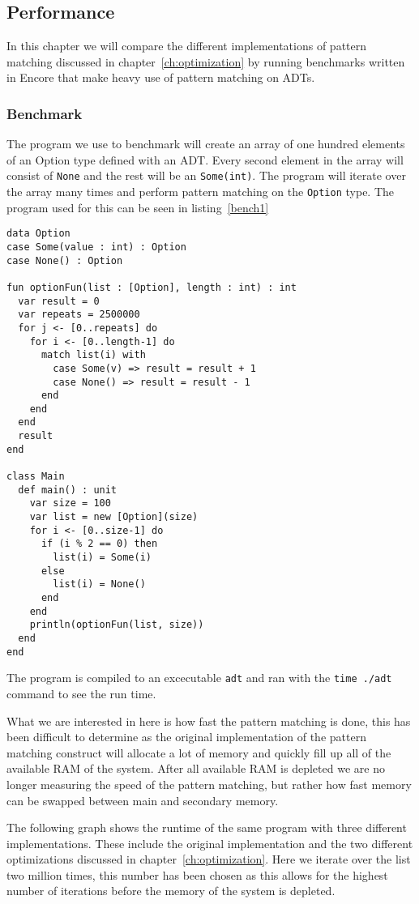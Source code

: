 \documentclass[10pt]{report}
\def\code#1{\texttt{#1}} %
\begin{document}
{\subsection{Performance}
\par{In this chapter we will compare the different implementations of pattern matching discussed in chapter~\ref{ch:optimization} by running benchmarks written in Encore that make heavy use of pattern matching on ADTs.}
\subsubsection{Benchmark}
\par{The program we use to benchmark will create an array of one hundred elements of an Option type defined with an ADT. Every second element in the array will consist of \code{None} and the rest will be an \code{Some(int)}. The program will iterate over the array many times and perform pattern matching on the \code{Option} type. The program used for this can be seen in listing~\ref{bench1}}

\begin{lstlisting}[language=encore,caption={Program used for benchmarking},label=bench1]
data Option
case Some(value : int) : Option
case None() : Option

fun optionFun(list : [Option], length : int) : int
  var result = 0
  var repeats = 2500000
  for j <- [0..repeats] do
    for i <- [0..length-1] do
      match list(i) with
        case Some(v) => result = result + 1
        case None() => result = result - 1
      end
    end
  end
  result
end

class Main
  def main() : unit
    var size = 100
    var list = new [Option](size)
    for i <- [0..size-1] do
      if (i % 2 == 0) then
        list(i) = Some(i)
      else
        list(i) = None()
      end
    end
    println(optionFun(list, size))
  end
end
\end{lstlisting}
\par{The program is compiled to an excecutable \code{adt} and ran with the \code{time ./adt} command to see the run time.}
\par{What we are interested in here is how fast the pattern matching is done, this has been difficult to determine as the original implementation of the pattern matching construct will allocate a lot of memory and quickly fill up all of the available RAM of the system. After all available RAM is depleted we are no longer measuring the speed of the pattern matching, but rather how fast memory can be swapped between main and secondary memory.}
\par{The following graph shows the runtime of the same program with three different implementations. These include the original implementation and the two different optimizations discussed in chapter~\ref{ch:optimization}. Here we iterate over the list two million times, this number has been chosen as this allows for the highest number of iterations before the memory of the system is depleted.}

}
\end{document}
